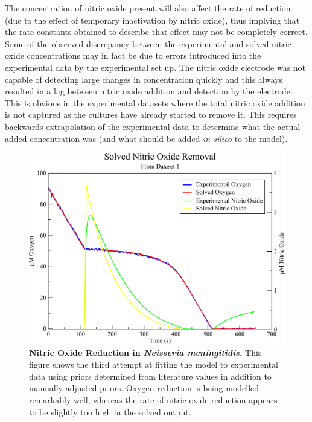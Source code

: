 The concentration of nitric oxide present will also affect the rate of \cbbthree{} reduction (due to the effect of temporary inactivation by nitric oxide), thus implying that the rate constants obtained to describe that effect may not be completely correct. Some of the observed discrepancy between the experimental and solved nitric oxide concentrations may in fact be due to errors introduced into the experimental data by the experimental set up. The nitric oxide electrode was not capable of detecting large changes in concentration quickly and this always resulted in a lag between nitric oxide addition and detection by the electrode. This is obvious in the experimental datasets where the total nitric oxide addition is not captured as the cultures have already started to remove it. This requires backwards extrapolation of the experimental data to determine what the actual added concentration was (and what should be added \textit{in silico} to the model).

\begin{figure}[tbp]
 \centering
 \includegraphics[width=15cm, clip=true]{./06-noreduction/data/aer-no-sim3-1.pdf}
 \caption[{Nitric Oxide Reduction in \textit{Neisseria meningitidis}.}]{{\bf Nitric Oxide Reduction in \textit{Neisseria meningitidis}.} This figure shows the third attempt at fitting the model to experimental data using priors determined from literature values in addition to manually adjusted priors. Oxygen reduction is being modelled remarkably well, whereas the rate of nitric oxide reduction appears to be slightly too high in the solved output.}
 \label{fig:nosim3.2}
\end{figure}

